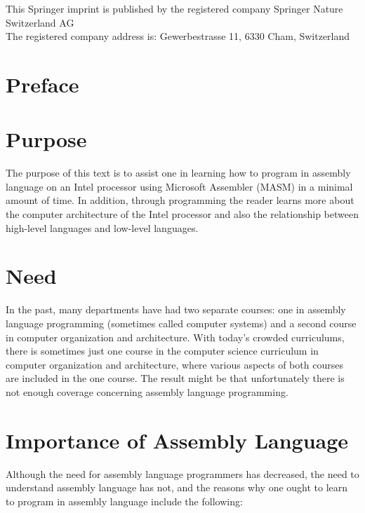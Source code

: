 \documentclass[10pt]{article}
\begin{document}
This Springer imprint is published by the registered company Springer Nature Switzerland AG\\
The registered company address is: Gewerbestrasse 11, 6330 Cham, Switzerland


\section*{Preface}
\section*{Purpose}
The purpose of this text is to assist one in learning how to program in assembly language on an Intel processor using Microsoft Assembler (MASM) in a minimal amount of time. In addition, through programming the reader learns more about the computer architecture of the Intel processor and also the relationship between high-level languages and low-level languages.

\section*{Need}
In the past, many departments have had two separate courses: one in assembly language programming (sometimes called computer systems) and a second course in computer organization and architecture. With today's crowded curriculums, there is sometimes just one course in the computer science curriculum in computer organization and architecture, where various aspects of both courses are included in the one course. The result might be that unfortunately there is not enough coverage concerning assembly language programming.

\section*{Importance of Assembly Language}
Although the need for assembly language programmers has decreased, the need to understand assembly language has not, and the reasons why one ought to learn to program in assembly language include the following:
\end{document}
